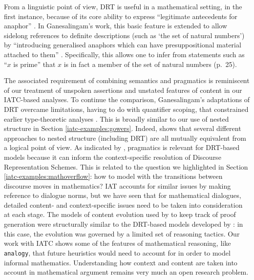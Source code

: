 \documentclass[smallextended,oneside]{svjour3}       %
\let\cite\citep
\begin{document}
From a linguistic point of view, DRT is useful in a mathematical setting, in the first instance,
because of its core ability to express ``legitimate antecedents for anaphor''
\cite[p.~50]{ganesalingam2013language}.
In Ganesalingam's work, this basic feature is extended to allow
sidelong references to definite descriptions
(such as `the set of natural numbers')
by ``introducing generalised anaphors which can have presuppositional material
attached to them''
\cite[pp.~25, 237]{ganesalingam2013language}.
Specifically, this allows one to infer from statements such as
``$x$ is prime'' that $x$ is in fact a member of the set of natural numbers (p.~25). 

The associated requirement of combining semantics and pragmatics \cite[p.~336]{doi:10.1093/jos/9.4.333}
is reminiscent of our treatment of unspoken assertions
and unstated features of content in our IATC-based analyses.
To continue the comparison, Ganesalingam's adaptations of DRT
overcame limitations, having to do with quantifier scoping, that constrained
earlier type-theoretic analyses \cite[pp.~81--82]{ganesalingam2013language}.
This is broadly similar to our use of nested structure in Section \ref{iatc-examples:gowers}.
Indeed, \citet{sowa2000knowledge} shows that several different approaches
to nested structure (including DRT)
are all mutually equivalent from a logical point of view.
As indicated by
\citet{doi:10.1093/jos/9.4.333},
pragmatics is relevant for DRT-based models
because it can inform the context-specific resolution of Discourse
Representation Schemes.  This is related to
the question we highlighted in Section \ref{iatc-examples:mathoverflow}:
how to model with the transitions between discourse moves in mathematics?
IAT accounts for similar issues by making reference to dialogue norms,
but we have seen that for mathematical dialogues,
detailed content- and context-specific issues need to be
taken into consideration at each stage.
The models of content evolution used by
\citet{ganesalingam2016fully} to keep track of proof generation were
structurally similar to the DRT-based models developed by
\citet{ganesalingam2013language}: in this case, the evolution was
governed by a limited set of reasoning tactics.  Our work with IATC shows some of the
features of mathematical reasoning, like \texttt{analogy}, that future
heuristics would need to account for in order to model informal mathematics.
Understanding how context and content are taken into account in mathematical
argument remains very much an open research problem.
\end{document}
